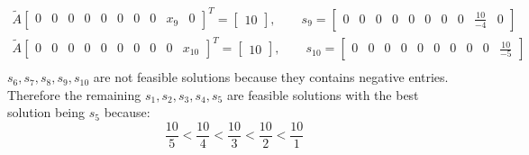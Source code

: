 \documentclass{beamer}
\begin{document}
{\begin{align*}
        \tilde{A}
        \begin{bmatrix}
          0 & 0 & 0 & 0 & 0 & 0 & 0 & 0 & x_9 & 0
        \end{bmatrix}^T
        =
        \begin{bmatrix}10\end{bmatrix},\qquad s_9=\begin{bmatrix}
          0 & 0 & 0 & 0 & 0 & 0 & 0 & 0 & \frac{10}{-4} & 0
        \end{bmatrix} \\
        \tilde{A}
        \begin{bmatrix}
          0 & 0 & 0 & 0 & 0 & 0 & 0 & 0 & 0 & x_{10}
        \end{bmatrix}^T
        =
        \begin{bmatrix}10\end{bmatrix},\qquad s_{10}=\begin{bmatrix}
          0 & 0 & 0 & 0 & 0 & 0 & 0 & 0 & 0 & \frac{10}{-5}
        \end{bmatrix} \\
    \end{align*}
    $s_6, s_7, s_8, s_9, s_{10}$ are not feasible solutions because they contains negative entries. Therefore the remaining $s_1, s_2, s_3, s_4, s_5$ are feasible solutions with the best solution being $s_5$ because: \[\frac{10}{5} < \frac{10}{4} < \frac{10}{3} < \frac{10}{2} < \frac{10}{1}\]
  }

\end{document}

